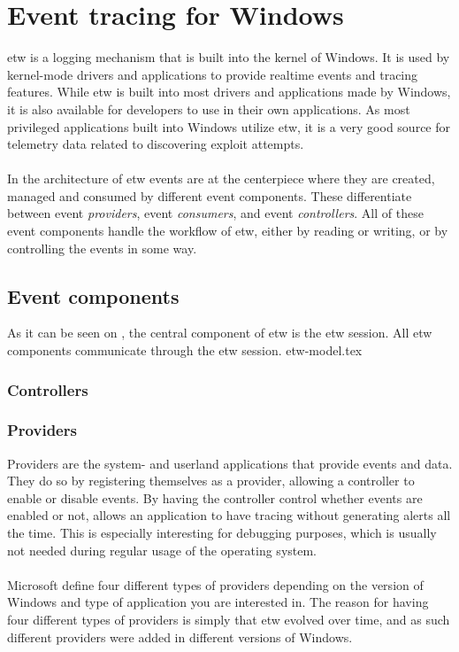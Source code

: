 \documentclass{report}
\begin{document}
\section{Event tracing for Windows}
\label{cha:etw}
\gls{etw} is a logging mechanism that is built into the kernel of Windows. It is used by kernel-mode drivers and applications to provide realtime events and tracing features. While \gls{etw} is built into most drivers and applications made by Windows, it is also available for developers to use in their own applications. As most privileged applications built into Windows utilize \gls{etw}, it is a very good source for telemetry data related to discovering exploit attempts.
\\
\\
In the architecture of \gls{etw} events are at the centerpiece where they are created, managed and consumed by different event components\cite{url:etw:about}. These differentiate between event \emph{providers}, event \emph{consumers}, and event \emph{controllers}. All of these event components handle the workflow of \gls{etw}, either by reading or writing, or by controlling the events in some way.

\subsection{Event components}
As it can be seen on , the central component of \gls{etw} is the \gls{etw} session. All \gls{etw} components communicate through the \gls{etw} session.
{etw-model.tex}
\subsubsection{Controllers}
\subsubsection{Providers}
Providers are the system- and userland applications that provide events and data. They do so by registering themselves as a provider, allowing a controller to enable or disable events. By having the controller control whether events are enabled or not, allows an application to have tracing without generating alerts all the time. This is especially interesting for debugging purposes, which is usually not needed during regular usage of the operating system.
\\
\\
Microsoft define four different types of providers depending on the version of Windows and type of application you are interested in. The reason for having four different types of providers is simply that \gls{etw} evolved over time, and as such different providers were added in different versions of Windows\cite{url:etw:provider-types}.
\end{document}
